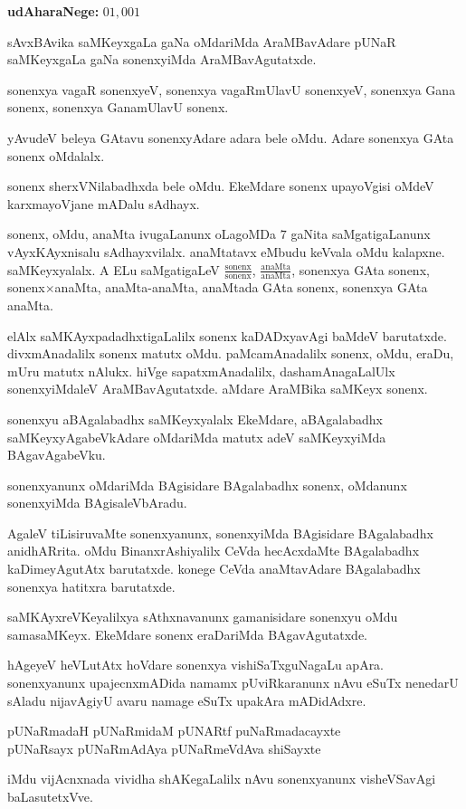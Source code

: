 \textbf{udAharaNege:} $01,001$

sAvxBAvika saMKeyxgaLa gaNa oMdariMda AraMBavAdare pUNaR saMKeyxgaLa gaNa sonenx\-yiMda AraMBavAgutatxde.

sonenxya vagaR sonenxyeV, sonenxya vagaRmUlavU sonenxyeV, sonenxya Gana sonenx, sonenxya GanamUlavU sonenx.

yAvudeV beleya GAtavu sonenxyAdare adara bele oMdu. Adare sonenxya GAta sonenx oMdalalx.

sonenx sherxVNilabadhxda bele oMdu. EkeMdare sonenx upayoVgisi oMdeV karxma\-yoVjane mADalu sAdhayx.

sonenx, oMdu, anaMta ivugaLanunx oLagoMDa $7$ gaNita saMgatigaLanunx vAyxKAyx\-nisalu sAdhayxvilalx. anaMtatavx eMbudu keVvala oMdu kalapxne. saMKeyxyalalx. A ELu saMgatigaLeV $\frac{\text{sonenx}}{\text{sonenx}}$, $\frac{\text{anaMta}}{\text{anaMta}}$, sonenxya GAta sonenx, sonenx$\times$anaMta, anaMta-anaMta, anaMtada GAta sonenx, sonenxya GAta anaMta.

elAlx saMKAyxpadadhxtigaLalilx sonenx kaDADxyavAgi baMdeV barutatxde. divxmAnadalilx sonenx matutx oMdu. paMcamAnadalilx sonenx, oMdu, eraDu, mUru matutx nAlukx. hiVge sapatxmAnadalilx, dashamAnagaLalUlx sonenxyiMdaleV AraMBavAgutatxde. aMdare AraMBika saMKeyx sonenx.

sonenxyu aBAgalabadhx saMKeyxyalalx EkeMdare, aBAgalabadhx saMKeyxyAgabeVkAdare oMdariMda matutx adeV saMKeyxyiMda BAgavAgabeVku.

sonenxyanunx oMdariMda BAgisidare BAgalabadhx sonenx, oMdanunx sonenxyiMda BAgisaleVbAradu.

AgaleV tiLisiruvaMte sonenxyanunx, sonenxyiMda BAgisidare BAgalabadhx anidhAR\-rita. oMdu BinanxrAshiyalilx CeVda hecAcxdaMte BAgalabadhx kaDimeyAgutAtx barutatxde. konege CeVda anaMtavAdare BAgalabadhx sonenxya hatitxra barutatxde.

saMKAyxreVKeyalilxya sAthxnavanunx gamanisidare sonenxyu oMdu samasaMKeyx. EkeMdare sonenx eraDariMda BAgavAgutatxde.

hAgeyeV heVLutAtx hoVdare sonenxya vishiSaTxguNagaLu apAra. sonenxyanunx upajecnxmADida namamx pUviRkaranunx nAvu eSuTx nenedarU sAladu nijavAgiyU avaru namage eSuTx upakAra mADidAdxre.
\begin{center}
pUNaRmadaH pUNaRmidaM pUNARtf puNaRmadacayxte\\
pUNaRsayx pUNaRmAdAya pUNaRmeVdAva shiSayxte 
\end{center}

iMdu vijAcnxnada vividha shAKegaLalilx nAvu sonenxyanunx visheVSavAgi baLasutetxVve.

